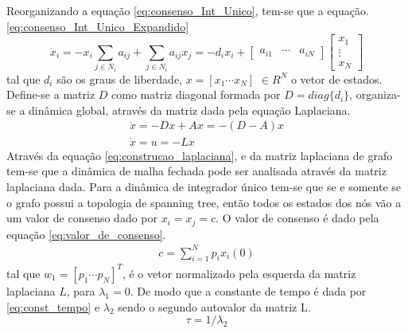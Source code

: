 Reorganizando a equação \ref{eq:consenso_Int_Unico}, tem-se que a equação. \ref{eq:consenso_Int_Unico_Expandido}
\begin{equation}\label{eq:consenso_Int_Unico_Expandido}
    \dot x_{i} = -x_{i}\sum\limits_{j \in N_{i}} a_{ij} + 
    \sum\limits_{j \in N_{i}} a_{ij}x_{j} = -d_{i}x_{i} + 
   \left[
   \begin{array}{ccc}
   a_{i1}&\cdots&a_{iN} 
    \end{array}
    \right] 
   \left[
   \begin{array}{ccc}
        x_{1} \\
        \vdots \\
        x_{N}
    \end{array}
    \right]
\end{equation}
tal que $d_{i}$ são os graus de liberdade, $x = [x_{1} \cdots x_{N}]$ $\in R^N$ o vetor de estados. Define-se a matriz $D$ como matriz diagonal formada por $D = diag \{d_{i}\}$, organiza-se a 
dinâmica global, através da matriz dada pela equação Laplaciana.
\begin{equation}\label{eq:construcao_laplaciana}
    \begin{aligned}
        \dot x = -Dx +Ax = -(D-A)x \\
        \dot x = u = -Lx 
    \end{aligned}
\end{equation}
Através da equação \ref{eq:construcao_laplaciana}, e da matriz laplaciana de grafo tem-se que a dinâmica de malha fechada pode ser analisada através da matriz laplaciana dada.
Para a dinâmica de integrador único tem-se que se e somente se o grafo possui a topologia de spanning tree, então todos os estados dos nós vão a um valor de consenso dado por $x_{i} = x_{j} = c$. O valor de consenso é dado pela equação \ref{eq:valor_de_consenso}.
\begin{equation}\label{eq:valor_de_consenso}
    \begin{aligned}
        c = \sum\limits_{i = 1}^{N} p_{i}x_{i}(0)
    \end{aligned}
\end{equation}
tal que $w_{1} = [p_{1} \cdots p_{N}]^{T}$, é o vetor normalizado pela esquerda da matriz laplaciana $L$, para $  \lambda_{1} = 0$. De modo que a constante de tempo é dada por \ref{eq:const_tempo} e $\lambda_{2}$ sendo o segundo autovalor da matriz L.
\begin{equation}\label{eq:const_tempo}
   \tau = 1 / \lambda_{2}
\end{equation}


